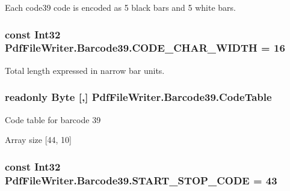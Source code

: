 Each code39 code is encoded as 5 black bars and 5 white bars. 

\subsubsection[{\texorpdfstring{C\+O\+D\+E\+\_\+\+C\+H\+A\+R\+\_\+\+W\+I\+D\+TH}{CODE_CHAR_WIDTH}}]{\setlength{\rightskip}{0pt plus 5cm}const Int32 Pdf\+File\+Writer.\+Barcode39.\+C\+O\+D\+E\+\_\+\+C\+H\+A\+R\+\_\+\+W\+I\+D\+TH = 16}\hypertarget{class_pdf_file_writer_1_1_barcode39_a39d2b92ae23e401f41641ca3dc9d2cfb}{}\label{class_pdf_file_writer_1_1_barcode39_a39d2b92ae23e401f41641ca3dc9d2cfb}


Total length expressed in narrow bar units. 

\subsubsection[{\texorpdfstring{Code\+Table}{CodeTable}}]{\setlength{\rightskip}{0pt plus 5cm}readonly Byte \mbox{[},\mbox{]} Pdf\+File\+Writer.\+Barcode39.\+Code\+Table\hspace{0.3cm}{\ttfamily [static]}}\hypertarget{class_pdf_file_writer_1_1_barcode39_a7f4ebbab26f4b6ee21066c7aed85a738}{}\label{class_pdf_file_writer_1_1_barcode39_a7f4ebbab26f4b6ee21066c7aed85a738}


Code table for barcode 39 

Array size \mbox{[}44, 10\mbox{]}
\subsubsection[{\texorpdfstring{S\+T\+A\+R\+T\+\_\+\+S\+T\+O\+P\+\_\+\+C\+O\+DE}{START_STOP_CODE}}]{\setlength{\rightskip}{0pt plus 5cm}const Int32 Pdf\+File\+Writer.\+Barcode39.\+S\+T\+A\+R\+T\+\_\+\+S\+T\+O\+P\+\_\+\+C\+O\+DE = 43}\hypertarget{class_pdf_file_writer_1_1_barcode39_a73c79a713ce1bc450b695c2e1a406cc6}{}\label{class_pdf_file_writer_1_1_barcode39_a73c79a713ce1bc450b695c2e1a406cc6}


